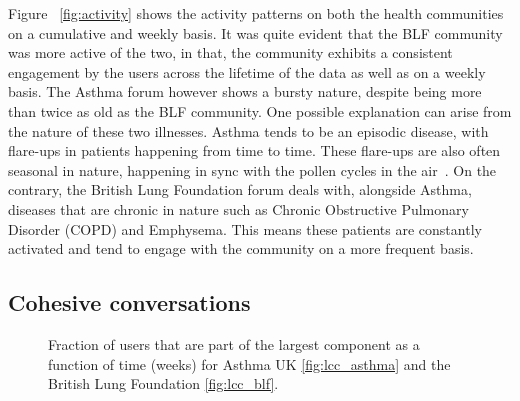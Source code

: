 Figure ~\ref{fig:activity} shows the activity patterns on both the health communities on a cumulative and weekly basis. It was quite evident that the BLF community was more active of the two, in that, the community exhibits a consistent engagement by the users across the lifetime of the data as well as on a weekly basis. The Asthma forum however shows a bursty nature, despite being more than twice as old as the BLF community. One possible explanation can arise from the nature of these two illnesses. Asthma tends to be an episodic disease, with flare-ups in patients happening from time to time. These flare-ups are also often seasonal in nature, happening in sync with the pollen cycles in the air~\cite{dellavalle2012effects}. On the contrary, the British Lung Foundation forum deals with, alongside Asthma, diseases that are chronic in nature such as Chronic Obstructive Pulmonary Disorder (COPD) and Emphysema. This means these patients are constantly activated and tend to engage with the community on a more frequent basis. 

\subsection{Cohesive conversations}

\begin{figure}[!ht]
    \centering
    
    \caption{Fraction of users that are part of the largest component as a function of time (weeks) for Asthma UK \ref{fig:lcc_asthma} and the British Lung Foundation \ref{fig:lcc_blf}.}
\end{figure}

